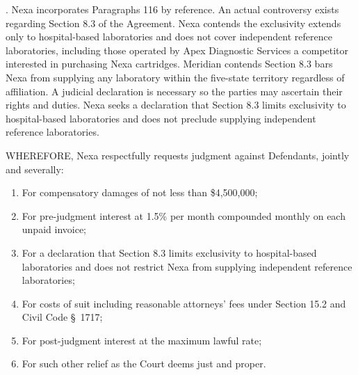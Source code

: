 \documentclass[12pt,letterpaper]{article}
\begin{document}

.\hspace{0.5em} Nexa incorporates Paragraphs 1\textendash{}16 by reference. An actual controversy exists regarding Section 8.3 of the Agreement. Nexa contends the exclusivity extends only to hospital-based laboratories and does not cover independent reference laboratories, including those operated by Apex Diagnostic Services \textemdash{} a competitor interested in purchasing Nexa cartridges. Meridian contends Section 8.3 bars Nexa from supplying any laboratory within the five-state territory regardless of affiliation. A judicial declaration is necessary so the parties may ascertain their rights and duties. Nexa seeks a declaration that Section 8.3 limits exclusivity to hospital-based laboratories and does not preclude supplying independent reference laboratories.


\noindent WHEREFORE, Nexa respectfully requests judgment against Defendants, jointly and severally:

\vspace{2pt}
\begin{enumerate}[leftmargin=2.5em,itemsep=0pt,topsep=0pt,labelsep=0.5em]
  \item For compensatory damages of not less than \$4,500,000;
  \item For pre-judgment interest at 1.5\% per month compounded monthly on each unpaid invoice;
  \item For a declaration that Section 8.3 limits exclusivity to hospital-based laboratories and does not restrict Nexa from supplying independent reference laboratories;
  \item For costs of suit including reasonable attorneys' fees under Section 15.2 and Civil Code \S\ 1717;
  \item For post-judgment interest at the maximum lawful rate;
  \item For such other relief as the Court deems just and proper.
\end{enumerate}

\vspace{4pt}

\end{document}
